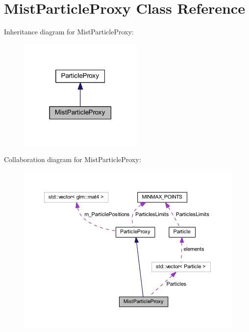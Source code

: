 \hypertarget{class_mist_particle_proxy}{}\section{Mist\+Particle\+Proxy Class Reference}
\label{class_mist_particle_proxy}


Inheritance diagram for Mist\+Particle\+Proxy\+:
\nopagebreak
\begin{figure}[H]
\begin{center}
\leavevmode
\includegraphics[width=174pt]{class_mist_particle_proxy__inherit__graph}
\end{center}
\end{figure}


Collaboration diagram for Mist\+Particle\+Proxy\+:
\nopagebreak
\begin{figure}[H]
\begin{center}
\leavevmode
\includegraphics[width=350pt]{class_mist_particle_proxy__coll__graph}
\end{center}
\end{figure}
